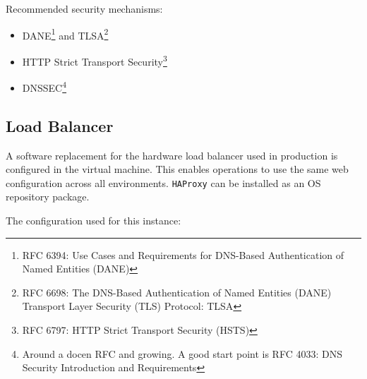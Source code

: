 \documentclass[11pt]{report}
\begin{document}
Recommended security mechanisms:

\begin{itemize}

    \item DANE\footnote{RFC 6394: Use Cases and Requirements for DNS-Based 
	Authentication of Named Entities (DANE)} and TLSA\footnote{RFC 6698: 
	The DNS-Based Authentication of Named Entities (DANE) Transport 
	Layer Security (TLS) Protocol: TLSA}

    \item HTTP Strict Transport Security\footnote{RFC 6797: HTTP Strict 
	Transport Security (HSTS)}

    \item DNSSEC\footnote{Around a docen RFC and growing. A good start point 
	is RFC 4033: DNS Security Introduction and Requirements}

\end{itemize}


\subsection{Load Balancer}

A software replacement for the hardware load balancer used in production is
configured in the virtual machine.  This enables operations to use the same web
configuration across all environments.  \verb|HAProxy| can be installed as an
OS repository package.

The configuration used for this instance:
\end{document}

